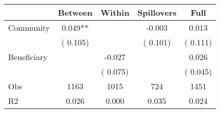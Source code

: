 
\begin{tabular}{l*{4}{c}}\hline&\multicolumn{1}{c}{Between}&\multicolumn{1}{c}{Within}&\multicolumn{1}{c}{Spillovers}&\multicolumn{1}{c}{Full}\\ \hline
 Community             &              0.049**      &                                               &       -0.003 &         0.013                            \\ 
                               &        (       0.105)           &                                       &       (       0.101)     &      (       0.111)                                           \\ 
 Beneficiary   &                                               &       -0.027    &                                &             0.026                            \\ 
                               &                                               & (       0.075)                  &                                        &      (       0.045)                                           \\ 
\hline                                                                                                                                                                                                                                            
 Obs                   &               1163               &       1015                       &       724                &              1451                                               \\ 
 R2                    &                      0.026              &              0.000                      &              0.035               &                     0.024                                              \\ 
\hline \end{tabular}                                                                                                                                                                                                              